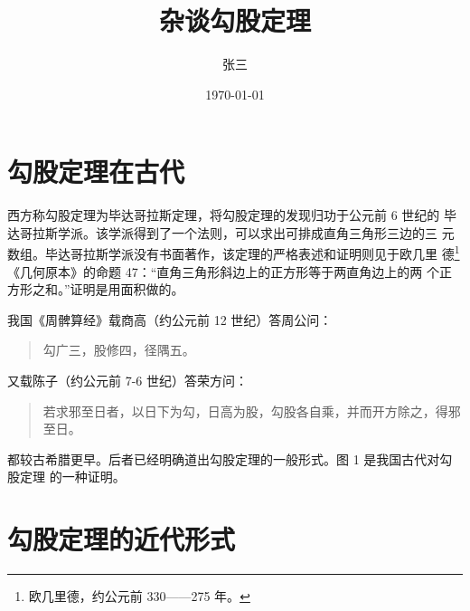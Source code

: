 \documentclass[UTF8]{ctexart}
\title{杂谈勾股定理}
\author{张三}
\date{\today}
\begin{document}
\maketitle
\tableofcontents
\section{勾股定理在古代}
西方称勾股定理为毕达哥拉斯定理，将勾股定理的发现归功于公元前 6 世纪的
毕达哥拉斯学派。该学派得到了一个法则，可以求出可排成直角三角形三边的三
元数组。毕达哥拉斯学派没有书面著作，该定理的严格表述和证明则见于欧几里
德\footnote{欧几里德，约公元前 330——275 年。}《几何原本》的命题 47：“直角三角形斜边上的正方形等于两直角边上的两
个正方形之和。”证明是用面积做的。

我国《周髀算经》载商高（约公元前 12 世纪）答周公问：
\begin{quote}
\kaishu 勾广三，股修四，径隅五。
\end{quote}
又载陈子（约公元前 7-6 世纪）答荣方问：
\begin{quote}
\kaishu 若求邪至日者，以日下为勾，日高为股，勾股各自乘，并而开方除之，得邪至日。
\end{quote}
都较古希腊更早。后者已经明确道出勾股定理的一般形式。图 1 是我国古代对勾股定理
的一种证明。
\section{勾股定理的近代形式}

\end{document}
